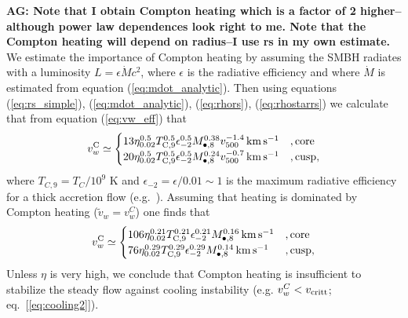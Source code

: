 \documentclass[usenatbib,fleqn]{mn2e}
\begin{document}
{\bf AG: Note that I obtain Compton heating which is a factor of 2
  higher--although power law dependences look right to me. Note that
  the Compton heating will depend on radius--I use rs in my own
  estimate. }
We estimate the importance of Compton heating by assuming the SMBH
radiates with a luminosity $L = \epsilon \dot{M}c^{2}$, where
$\epsilon$ is the radiative efficiency and where $\dot{M}$ is
estimated from equation (\ref{eq:mdot_analytic}).  Then using
equations (\ref{eq:rs_simple}), (\ref{eq:mdot_analytic}),
(\ref{eq:rhors}), (\ref{eq:rhostarrs}) we calculate that from equation
(\ref{eq:vw_eff}) that
\begin{align} v_{w}^{\rm C} \simeq
  \begin{cases} 13 \eta_{0.02}^{0.5}T_{\rm
C,9}^{0.5}\epsilon_{-2}^{0.5} M_{\bullet,8}^{0.38}v_{500}^{-1.4}\,{\rm
km\,s^{-1}} &, \text{core}\\ 20 \eta_{0.02}^{0.5}T_{\rm
C,9}^{0.5}\epsilon_{-2}^{0.5} M_{\bullet,8}^{0.24}v_{500}^{-0.7}\,{\rm
km\,s^{-1}} &, \text{cusp},
  \end{cases}
  \label{eq:vC}
\end{align} where $T_{C,9} = T_{C}/10^{9}$ K and $\epsilon_{-2} =
\epsilon/0.01 \sim 1$ is the maximum radiative efficiency for a thick
accretion flow (e.g.~\citealt{Narayan&Yi95}).  Assuming that heating
is dominated by Compton heating ($\tilde{v}_{w} = v_{w}^{C}$) one finds
that
\begin{align} v_{w}^{\rm C} \simeq
  \begin{cases} 106 \eta_{0.02}^{0.21}T_{\rm
C,9}^{0.21}\epsilon_{-2}^{0.21} M_{\bullet,8}^{0.16}\,{\rm km\,s^{-1}}
&, \text{core}\\ 76 \eta_{0.02}^{0.29}T_{\rm
C,9}^{0.29}\epsilon_{-2}^{0.29} M_{\bullet,8}^{0.14}\,{\rm km\,s^{-1}}
&, \text{cusp},
  \end{cases}
  \label{eq:vC2}
\end{align} Unless $\eta$ is very high, we conclude that Compton
heating is insufficient to stabilize the steady flow against cooling
instability (e.g. $v_{w}^{C} < v_{\rm critt}$;
eq.~[\ref{eq:cooling2}]).
\end{document}
